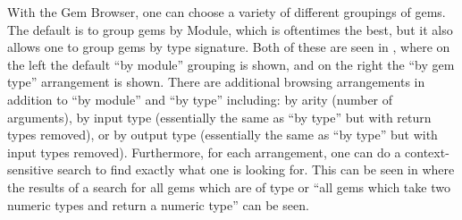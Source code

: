 With the Gem Browser, one can choose a variety of different groupings of gems.  The default is to group gems by Module, which is oftentimes the best, but it also allows one to group gems by type signature.  Both of these are seen in , where on the left the default ``by module'' grouping is shown, and on the right the ``by gem type'' arrangement is shown.  There are additional browsing arrangements in addition to ``by module'' and ``by type'' including: by arity (number of arguments), by input type (essentially the same as ``by type'' but with return types removed), or by output type (essentially the same as ``by type'' but with input types removed).  Furthermore, for each arrangement, one can do a context-sensitive search to find exactly what one is looking for.  This can be seen in  where the results of a search for all gems which are of type  or ``all gems which take two numeric types and return a numeric type'' can be seen.

